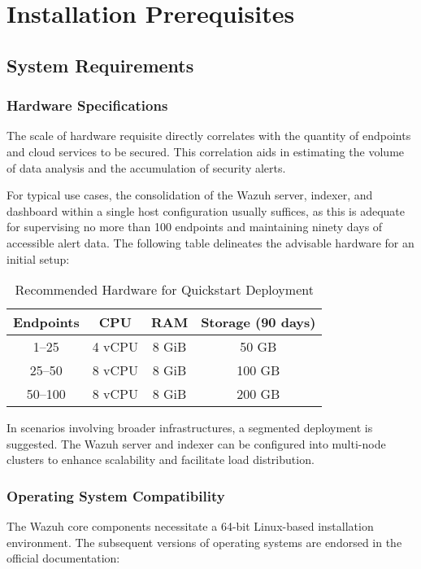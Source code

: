 \section{Installation Prerequisites}
\subsection{System Requirements}
\subsubsection{Hardware Specifications}

The scale of hardware requisite directly correlates with the quantity of endpoints and cloud services to be secured. This correlation aids in estimating the volume of data analysis and the accumulation of security alerts.

For typical use cases, the consolidation of the Wazuh server, indexer, and dashboard within a single host configuration usually suffices, as this is adequate for supervising no more than 100 endpoints and maintaining ninety days of accessible alert data. The following table delineates the advisable hardware for an initial setup:

\begin{table}[H]
\centering
\begin{tabular}{|c|c|c|c|}
\hline
\textbf{Endpoints} & \textbf{CPU} & \textbf{RAM} & \textbf{Storage (90 days)} \\ \hline
1–25      & 4 vCPU    & 8 GiB & 50 GB             \\ \hline
25–50     & 8 vCPU    & 8 GiB & 100 GB            \\ \hline
50–100    & 8 vCPU    & 8 GiB & 200 GB            \\ \hline
\end{tabular}
\caption{Recommended Hardware for Quickstart Deployment}
\label{table:hardware_req}
\end{table}


In scenarios involving broader infrastructures, a segmented deployment is suggested. The Wazuh server and indexer can be configured into multi-node clusters to enhance scalability and facilitate load distribution.

\subsubsection{Operating System Compatibility}

The Wazuh core components necessitate a 64-bit Linux-based installation environment. The subsequent versions of operating systems are endorsed in the official documentation:

